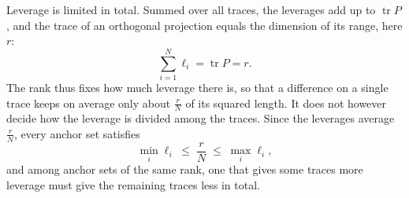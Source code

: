 \documentclass[titlepage,a4paper,11pt]{report}
\begin{document}
    Leverage is limited in total. Summed over all traces, the leverages add up to $\operatorname{tr}P$, and the trace of an orthogonal projection equals the dimension of its range, here $r$:
    \begin{equation}\label{eq:leverage_budget}
        \sum_{i=1}^{N} \ell_i = \operatorname{tr}P = r .
    \end{equation}
    The rank thus fixes how much leverage there is, so that a difference on a single trace keeps on average only about $\frac{r}{N}$ of its squared length. It does not however decide how the leverage is divided among the traces. Since the leverages average $\frac{r}{N}$, every anchor set satisfies
    \begin{equation}\label{eq:leverage_extremes}
        \min_i\ell_i\;\le\;\frac rN\;\le\;\max_i\ell_i ,
    \end{equation}
    and among anchor sets of the same rank, one that gives some traces more leverage must give the remaining traces less in total.
 
\end{document}
